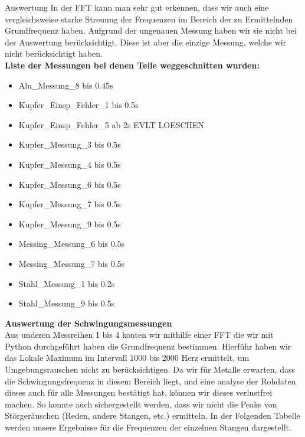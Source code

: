 \documentclass[twoside]{protokoll}
\begin{document}
\begin{aufgabe}{Auswertung}
In der FFT kann man sehr gut erkennen, dass wir auch eine vergleichsweise starke Streuung der Frequenzen im Bereich der zu Ermittelnden Grundfrequenz haben.
Aufgrund der ungenauen Messung haben wir sie nicht bei der Auswertung berücksichtigt.
Diese ist aber die einzige Messung, welche wir nicht berücksichtigt haben. \\
 

\textbf{Liste der Messungen bei denen Teile weggeschnitten wurden:}
\begin{itemize}
\item Alu\_Messung\_8 bis 0.45s
\item Kupfer\_Einsp\_Fehler\_1 bis 0.5s
\item Kupfer\_Einsp\_Fehler\_5 ab 2s EVLT LOESCHEN
\item Kupfer\_Messung\_3 bis 0.5s
\item Kupfer\_Messung\_4 bis 0.5s
\item Kupfer\_Messung\_6 bis 0.5s
\item Kupfer\_Messung\_7 bis 0.5s
\item Kupfer\_Messung\_9 bis 0.5s
\item Messing\_Messung\_6 bis 0.5s
\item Messing\_Messung\_7 bis 0.5s
\item Stahl\_Messung\_1 bis 0.2s
\item Stahl\_Messung\_9 bis 0.5s
\end{itemize}

 
\textbf{Auswertung der Schwingungsmessungen}\\
Aus underen Messreihen 1 bis 4 konten wir mithilfe einer FFT die wir mit Python durchgeführt haben die Grundfrequenz bestimmen.
Hierführ haben wir das Lokale Maximum im Intervall 1000 bis 2000 Herz ermittelt, um Umgebungsrauschen nicht zu berücksichtigen.
Da wir für Metalle erwarten, dass die Schwingungsfrequenz in diesem Bereich liegt, und eine analyse der Rohdaten dieses auch für alle Messungen bestätigt hat, können wir dieses verlustfrei machen.
So konnte auch sichergestellt werden, dass wir nicht die Peaks von Störgeräuschen (Reden, andere Stangen, etc.) ermitteln.
In der Folgenden Tabelle werden unsere Ergebnisse für die Frequenzen der einzelnen Stangen dargestellt.



\end{aufgabe}
\end{document}
